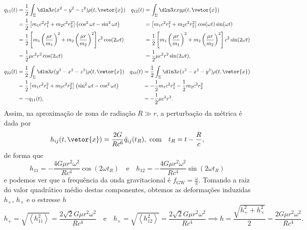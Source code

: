 \begin{align*}
    q_{11}(t) &= \frac12 \int_{\Sigma}\dln3x (x^2 - y^2 - z^2) \rho(t, \vetor{x})&
    q_{12}(t) &= \int_{\Sigma}\dln3x xy \rho(t, \vetor{x})\\
              &= \frac12\left[m_1c^2 r_1^2 + m_2 c^2r_2^2\right] \left(\cos^2\omega t - \sin^2 \omega t\right)&
              &= \left[m_1 c^2 r_1^2 + m_2 c^2 r_2^2\right] \cos(\omega t)\sin(\omega t)\\
              &= \frac12 \left[m_1 \left(\frac{\mu r}{m_1}\right)^2 + m_2\left(\frac{\mu r}{m_2}\right)^2\right] c^2\cos(2\omega t)&
              &= \frac12\left[m_1\left(\frac{\mu r}{m_1}\right)^2 + m_2\left(\frac{\mu r}{m_2}\right)^2\right]c^2\sin(2\omega t)\\
              &= \frac12 \mu c^2 r^2\cos(2\omega t)&
              &= \frac12 \mu c^2 r^2 \sin(2\omega t),
\end{align*}
\begin{align*}
    q_{22}(t) &= \frac12 \int_{\Sigma}\dln3x (y^2 - x^2 - z^2) \rho(t, \vetor{x})&
    q_{33}(t) &= \frac12 \int_{\Sigma}\dln3x (z^2 - x^2 - y^2) \rho(t, \vetor{x})\\
              &= \frac12\left[m_1c^2 r_1^2 + m_2 c^2r_2^2\right] \left(\sin^2\omega t - \cos^2 \omega t\right)&
              &= -\frac12 m_1c^2r_1^2  - \frac12 m_2c^2r_2^2\\
              &= - q_{11}(t),&
              &= - \frac12 \mu c^2 r^2.
\end{align*}
Assim, na aproximação de zona de radiação \(R \gg r\), a perturbação da métrica é dada por
\begin{equation*}
    h_{ij}(t, \vetor{x}) = \frac{2G}{Rc^6}\ddot{q}_{ij}(t_R),\text{ com}\quad t_R = t - \frac{R}{c},
\end{equation*}
de forma que
\begin{equation*}
    h_{11} = -\frac{4G\mu r^2\omega^2}{Rc^4}\cos(2\omega t_R)\quad\text{e}\quad h_{12} = -\frac{4G\mu r^2\omega^2}{Rc^4}\sin(2\omega t_R)
\end{equation*}
e podemos ver que a frequência da onda gravitacional é \(f_\mathrm{GW} = \frac{\omega}{\pi}\). Tomando a raiz do valor quadrático médio destas componentes, obtemos as deformações induzidas \(h_+\), \(h_\times\) e o estresse \(h\)
\begin{equation*}
    h_+ = \sqrt{\left\langle h_{11}^2\right\rangle} = \frac{2\sqrt{2}G\mu r^2\omega^2}{Rc^4}\quad\text{e}\quad
    h_\times = \sqrt{\left\langle h_{12}^2\right\rangle} = \frac{2\sqrt{2}G\mu r^2\omega^2}{Rc^4}\implies h = \frac{\sqrt{h_+^2 + h_\times^2}}{2} = \frac{2G\mu r^2 \omega^2}{Rc^4}.
\end{equation*}

